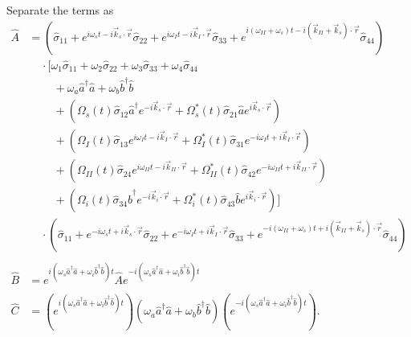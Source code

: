 \documentclass[aps,pra,showpacs,amsmath,amssymb,nofootinbib,longbibliography,superscriptaddress
]{revtex4-1}
\theoremstyle{definition}
\theoremstyle{remark}
\newcommand{\0}{\hat{0}}
\begin{document}
Separate the terms as
\begin{align}
    \hat{A}
    &=
    \left(\hat{\sigma}_{11} + e^{i \omega_s t - i \vec{k}_s \cdot \vec{r}} \hat{\sigma}_{22} + e^{i \omega_I t - i \vec{k}_I \cdot \vec{r}} \hat{\sigma}_{33} + e^{i(\omega_{II} + \omega_s) t - i(\vec{k}_{II} + \vec{k}_s) \cdot \vec{r}} \hat{\sigma}_{44}\right) \nonumber\\
    &\;\;\;\;\cdot\biggl[
        \omega_1 \hat{\sigma}_{11} + \omega_2 \hat{\sigma}_{22} + \omega_3 \hat{\sigma}_{33} + \omega_4 \hat{\sigma}_{44}\nonumber \\
        &\;\;\;\;\;\;\;\;+ \omega_{a} \hat{a}^{\dagger} \hat{a} + \omega_{b} \hat{b}^{\dagger} \hat{b}\nonumber \\
        &\;\;\;\;\;\;\;\;+ \left(\Omega_{s}(t) \hat{\sigma}_{12} \hat{a}^{\dagger} e^{-i \vec{k}_{s} \cdot \vec{r}} + \Omega_{s}^*(t) \hat{\sigma}_{21} \hat{a} e^{i \vec{k}_{s} \cdot \vec{r}}\right)\nonumber \\
        &\;\;\;\;\;\;\;\;+ \left(\Omega_{I}(t) \hat{\sigma}_{13} e^{i \omega_I t - i \vec{k}_I \cdot \vec{r}} + \Omega_{I}^*(t) \hat{\sigma}_{31} e^{-i \omega_I t + i \vec{k}_I \cdot \vec{r}}\right)\nonumber \\
        &\;\;\;\;\;\;\;\;+ \left(\Omega_{II}(t) \hat{\sigma}_{24} e^{i \omega_{II} t - i \vec{k}_{II} \cdot \vec{r}} + \Omega_{II}^*(t) \hat{\sigma}_{42} e^{-i \omega_{II} t + i \vec{k}_{II} \cdot \vec{r}}\right)\nonumber \\
        &\;\;\;\;\;\;\;\;+ \left(\Omega_{i}(t) \hat{\sigma}_{34} \hat{b}^{\dagger} e^{-i \vec{k}_{i} \cdot \vec{r}} + \Omega_{i}^*(t) \hat{\sigma}_{43} \hat{b} e^{i \vec{k}_{i} \cdot \vec{r}}\right)
    \biggr] \nonumber\\
    &\;\;\;\; \cdot
    \left(\hat{\sigma}_{11} + e^{-i \omega_s t + i \vec{k}_s \cdot \vec{r}} \hat{\sigma}_{22} + e^{-i \omega_I t + i \vec{k}_I \cdot \vec{r}} \hat{\sigma}_{33} + e^{-i(\omega_{II} + \omega_s) t + i(\vec{k}_{II} + \vec{k}_s) \cdot \vec{r}} \hat{\sigma}_{44}\right)\\\nonumber\\
    \hat{B}
    &=
    e^{i(\omega_s \hat{a}^{\dagger} \hat{a} + \omega_i \hat{b}^{\dagger} \hat{b})t} \hat{A} e^{-i(\omega_s \hat{a}^{\dagger} \hat{a} + \omega_i \hat{b}^{\dagger} \hat{b})t} \label{Beq} \\\nonumber\\
    \hat{C}
    &=
    \left(e^{i(\omega_s \hat{a}^{\dagger} \hat{a} + \omega_i \hat{b}^{\dagger} \hat{b})t}\right) \left(\omega_{a} \hat{a}^{\dagger}\hat{a} + \omega_{b} \hat{b}^{\dagger}\hat{b}\right)\left(e^{-i(\omega_s \hat{a}^{\dagger} \hat{a} + \omega_i \hat{b}^{\dagger} \hat{b})t}\right). \label{Unsimplified_C_eq}
\end{align}
\end{document}

